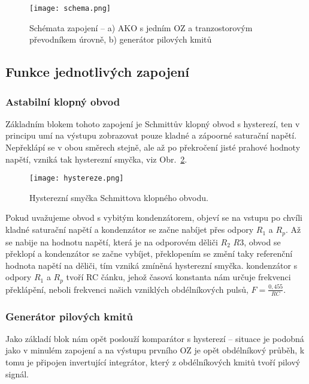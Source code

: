 \begin{figure}[h!]
    \centering
    \texttt{[image: schema.png]}
    \centering
    \caption{Schémata zapojení -- a) AKO s jedním OZ a tranzostorovým převodníkem úrovně, b) generátor pilových kmitů}
    \label{fig:schema}
\end{figure}



\subsection{Funkce jednotlivých zapojení}

    \subsubsection{Astabilní klopný obvod}

    Základním blokem tohoto zapojení je Schmittův klopný obvod s hysterezí, ten v principu umí na výstupu zobrazovat pouze kladné a zápoorné saturační napětí. Nepřeklápí se v obou směrech stejně, ale až po překročení jisté prahové hodnoty napětí, vzniká tak hysterezní smyčka, viz Obr.~\ref{fig:hystereze-png}.

    \begin{figure}[h!]
        \centering
        \texttt{[image: hystereze.png]}
        \caption{Hysterezní smyčka Schmittova klopného obvodu.}
        \label{fig:hystereze-png}
    \end{figure}
    
    Pokud uvažujeme obvod s vybitým kondenzátorem, objeví se na vstupu po chvíli kladné saturační napětí a kondenzátor se začne nabíjet přes odpory \(R_1\) a \(R_p\). 
    Až se nabije na hodnotu napětí, která je na odporovém děliči \(R_2\) \(R3\), obvod se překlopí a kondenzátor se začne vybíjet, překlopením se změní taky referenční hodnota napětí na děliči, tím vzniká zmíněná hysterezní smyčka.
    kondenzátor s odpory \(R_1\) a \(R_p\) tvoří RC čánku, jehož časová konstanta nám určuje frekvenci překlápění, neboli frekvenci našich vzniklých obdélníkových pulsů, \(F=\frac{0,455}{RC}\).

    \subsubsection{Generátor pilových kmitů}

    Jako základí blok nám opět poslouží komparátor s hysterezí -- situace je podobná jako v minulém zapojení a na výstupu prvního OZ je opět obdélníkový průběh, k tomu je připojen invertující integrátor, který z obdélníkových kmitů tvoří pilový signál.
    
